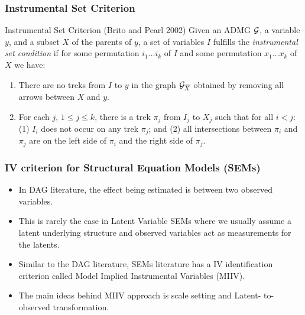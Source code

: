 \documentclass{beamer}
\begin{document}
\begin{frame}
	\frametitle{Instrumental Set Criterion}
	\begin{block}{Instrumental Set Criterion (Brito and Pearl 2002)}
Given an ADMG $\cal
	G$, a variable $y$, and a subset $X$ of the parents of $y$, 
	a set of variables
	$I$ fulfills the 
	\emph{instrumental set condition}
	if for {some} permutation $ i_1 \ldots i_k $ of
	$ I $ and {some} permutation
	$ x_1 \ldots x_k $ of $ X $ we have: 
	\begin{enumerate}
		\item There are no treks from $I$ to $y$ in the graph ${\cal
			G}_{\overline{X}}$ obtained by removing all arrows 
			between $X$ and $y$. 
		\item For each $j$, $1 \leq j \leq k$, there is a trek $\pi_j$ from
			$I_j$ to $X_j$ such that for all $i < j$: (1) $I_i$ does not
			occur on any trek $\pi_j$; and (2) all intersections between
			$\pi_i$ and $\pi_j$ are on the left side of $\pi_i$ and the
			right side of $\pi_j$.
	\end{enumerate}
	\end{block}
\end{frame}

\begin{frame}
	\frametitle{IV criterion for Structural Equation Models (SEMs)}
	\begin{itemize}
		\item In DAG literature, the effect being estimated is between two
			observed variables.
		\item This is rarely the case in Latent Variable SEMs where we usually
			assume a latent underlying structure and observed variables
			act as measurements for the latents.
		\item Similar to the DAG literature, SEMs literature has a IV 
			identification criterion called Model Implied Instrumental 
			Variables (MIIV).
		\item The main ideas behind MIIV approach is scale setting and Latent-
			to-observed transformation.
	\end{itemize}
\end{frame}
\end{document}
